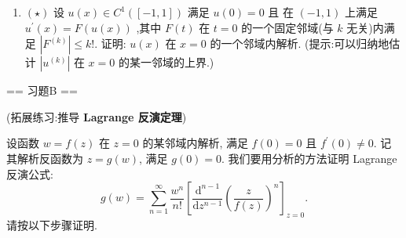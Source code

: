 \begin{enumerate}
    \item[7.]$(\star)$ 设 \(\displaystyle u(x)\in C^{1}([-1,1])\) 满足 \(u(0) = 0\) 且
    在 \((-1,1)\) 上满足 \(\displaystyle u^{\prime}(x) = F(u(x))\) ,其中 \(F(t)\) 在 \(t = 0\) 的一个固定邻域(与 \(k\) 无关)内满足 \(\displaystyle|F^{(k)}|\leq k!\).
    证明: \(u(x)\) 在 \(x = 0\) 的一个邻域内解析. (提示:可以归纳地估计 \(|u^{(k)}|\) 在 \(x = 0\) 的某一邻域的上界.)
\end{enumerate}

== 习题B ==

(拓展练习:推导 \textbf{Lagrange 反演定理})

设函数 \(\displaystyle w = f(z)\) 在 \(z = 0\) 的某邻域内解析, 满足 \(f(0) = 0\) 且 \(\displaystyle f^{\prime}(0)\neq 0\).
记其解析反函数为 \(\displaystyle z = g(w)\), 满足 \(g(0) = 0\).
我们要用分析的方法证明 Lagrange 反演公式:
\[\displaystyle g(w) = \sum_{n = 1}^{\infty}\frac{w^{n}}{n!}\left[\frac{\mathrm{d}^{n - 1}}{\mathrm{d}z^{n - 1}}\left(\frac{z}{f(z)}\right)^{n}\right]_{z = 0}.\]
请按以下步骤证明.

